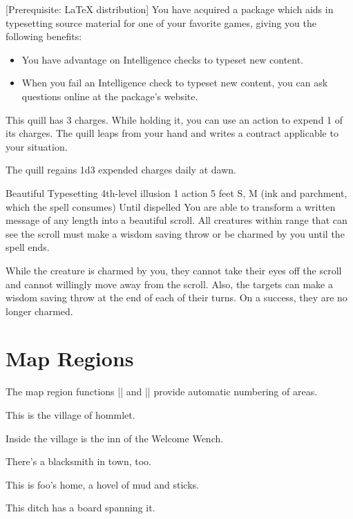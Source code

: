 \documentclass[10pt,twoside,twocolumn,nomultitoc,openany,nodeprecatedcode]{dndbook}
\begin{document}
	[Prerequisite: \LaTeX{} distribution]
	You have acquired a package which aids in typesetting source material for one of your favorite games, giving you the following benefits:
	
	\begin{itemize}
		\item You have advantage on Intelligence checks to typeset new content.
		\item When you fail an Intelligence check to typeset new content, you can ask questions online at the package's website.
	\end{itemize}
	
	This quill has 3 charges. While holding it, you can use an action to expend 1 of its charges. The quill leaps from your hand and writes a contract applicable to your situation.
	
	The quill regains 1d3 expended charges daily at dawn.
	
	\DndSpellHeader%
	{Beautiful Typesetting}
	{4th-level illusion}
	{1 action}
	{5 feet}
	{S, M (ink and parchment, which the spell consumes)}
	{Until dispelled}
	You are able to transform a written message of any length into a beautiful scroll. All creatures within range that can see the scroll must make a wisdom saving throw or be charmed by you until the spell ends.
	
	While the creature is charmed by you, they cannot take their eyes off the scroll and cannot willingly move away from the scroll. Also, the targets can make a wisdom saving throw at the end of each of their turns. On a success, they are no longer charmed.
	
	\section{Map Regions}
	The map region functions |\DndArea| and |\DndSubArea| provide automatic numbering of areas.
	
	This is the village of hommlet.
	
	Inside the village is the inn of the Welcome Wench.
	
	There's a blacksmith in town, too.
	
	This is foo's home, a hovel of mud and sticks.
	
	This ditch has a board spanning it.
	
\end{document}
